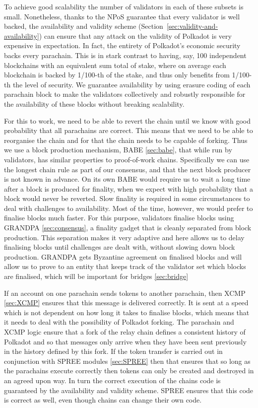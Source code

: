 To achieve good scalability the number of validators in each of these subsets is small. Nonetheless, thanks to the NPoS guarantee that every validator is well backed, the availability and validity scheme (Section~\ref{sec:validity-and-availability}) can ensure that any attack on the validity of Polkadot is very expensive in expectation. In fact, the entirety of Polkadot's economic security backs every parachain. This is in stark contrast to having, say, 100 independent blockchains with an equivalent sum total of stake, where on average each blockchain is backed by 1/100-th of the stake, and thus only benefits from 1/100-th the level of security. We guarantee availability by using erasure coding of each parachain block to make the validators collectively and robustly responsible for the availability of these blocks without breaking scalability. 

For this to work, we need to be able to revert the chain until we know with good probability that all parachains are correct. This means that we need to be able to reorganise the chain and for that the chain needs to be capable of forking. Thus we use a block production mechanism, BABE \ref{sec:babe}, that while run by validators, has similar properties to proof-of-work chains. Specifically we can use the longest chain rule as part of our consensus, and that the next block producer is not known in advance. On its own BABE would require us to wait a long time after a block is produced for finality, when we expect with high probability that a block would never be reverted. Slow finality is required in some circumstances to deal with challenges to availability. Most of the time, however, we would prefer to finalise blocks much faster.  For this purpose, validators finalise blocks using GRANDPA \ref{sec:consensus}, a finality gadget that is cleanly separated from block production. This separation makes it very adaptive and here allows us to delay finalising blocks until challenges are dealt with, without slowing down block production. GRANDPA gets Byzantine agreement on finalised blocks and will allow us to prove to an entity that keeps track of the validator set which blocks are finalised, which will be important for bridges \ref{sec:bridge}

If an account on one parachain sends tokens to another parachain, then XCMP \ref{sec:XCMP} ensures that this message is delivered correctly. It is sent at a speed which is not dependent on how long it takes to finalise blocks, which means that it needs to deal with the possibility of Polkadot forking. The parachain and XCMP logic ensure that a fork of the relay chain defines a consistent history of Polkadot and so that messages only arrive when they have been sent previously in the history defined by this fork. If the token transfer is carried out in conjunction with SPREE modules \ref{sec:SPREE} then that ensures that so long as the parachains execute correctly then tokens can only be created and destroyed in an agreed upon way. In turn the correct execution of the chains code is guaranteed by the availability and validity scheme. SPREE ensures that this code is correct as well, even though chains can change their own code.

